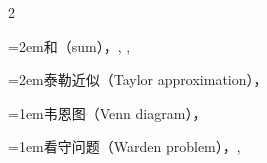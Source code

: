 \begin{multicols}{2}
\par\noindent\hangindent=2em\hspace*{1em}\label{idx:1068}和（sum），\hyperref[thm:4.5.6]{\pageref*{thm:4.5.6}}, \hyperref[exercise:4.44]{\pageref*{exercise:4.44}}, \hyperref[lem:5.2.5]{\pageref*{lem:5.2.5}}\par
\par\noindent\hangindent=2em\hspace*{1em}\label{idx:1069}泰勒近似（Taylor approximation），\hyperref[eq:5.5.9]{\pageref*{eq:5.5.9}}\par
\par\addvspace{2pt}
\par\noindent\hangindent=1em\hspace*{0em}\label{idx:1070}韦恩图（Venn diagram），\hyperref[idxocc:1070:34]{\pageref*{idxocc:1070:34}}\par
\par\addvspace{2pt}
\par\noindent\hangindent=1em\hspace*{0em}\label{idx:1071}看守问题（Warden problem），\hyperref[ex:1.3.4]{\pageref*{ex:1.3.4}}, \hyperref[exercise:1.37]{\pageref*{exercise:1.37}}\par
\end{multicols}
\endgroup
